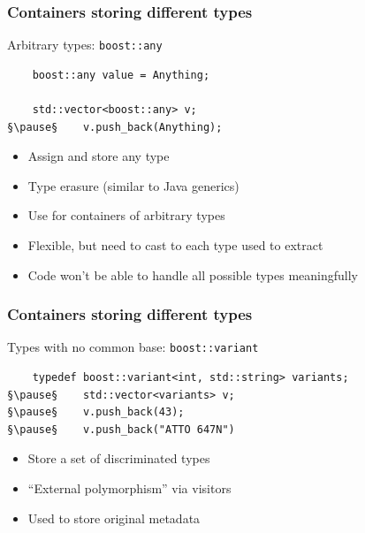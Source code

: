 \documentclass[handout]{beamer}
\begin{document}
\begin{frame}[fragile]
  \frametitle{Containers storing different types}
\begin{block}{Arbitrary types: \texttt{boost::any}}
  \begin{lstlisting}
    boost::any value = Anything;

    std::vector<boost::any> v;
§\pause§    v.push_back(Anything);
\end{lstlisting}
  \begin{itemize}
    \pause
  \item Assign and store any type
  \item Type erasure (similar to Java generics)
  \item Use for containers of arbitrary types
    \pause
  \item Flexible, but need to cast to each type used to extract
  \item Code won't be able to handle all possible types meaningfully
  \end{itemize}
\end{block}
\end{frame}

\begin{frame}[fragile]
  \frametitle{Containers storing different types}
\begin{block}{Types with no common base: \texttt{boost::variant}}
  \begin{lstlisting}
    typedef boost::variant<int, std::string> variants;
§\pause§    std::vector<variants> v;
§\pause§    v.push_back(43);
§\pause§    v.push_back("ATTO 647N")
\end{lstlisting}
  \begin{itemize}
    \pause
  \item Store a set of discriminated types
    \pause
  \item “External polymorphism” via visitors
    \pause
  \item Used to store original metadata
  \end{itemize}
\end{block}
\end{frame}
\end{document}
